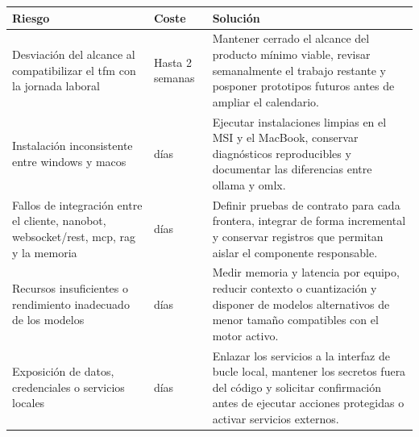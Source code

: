 \begin{table}[p]
    \centering
    \footnotesize
    \renewcommand{\arraystretch}{1.15}
    \begin{tabularx}{\textwidth}{
            |>{\raggedright\arraybackslash}p{4.2cm}
            |>{\centering\arraybackslash}p{2.1cm}
            |>{\raggedright\arraybackslash}X|
        }
        \hline
        \textbf{Riesgo} & \textbf{Coste}                                                                                                                                                                          & \textbf{Solución} \\ \hline
        Desviación del alcance al compatibilizar el \gls{tfm} con la jornada laboral
                        & Hasta 2 semanas
                        & Mantener cerrado el alcance del producto mínimo viable, revisar semanalmente el trabajo restante y posponer prototipos futuros antes de ampliar el calendario.                                              \\ \hline
        Instalación inconsistente entre \gls{windows} y \gls{macos}
                        & 5 días
                        & Ejecutar instalaciones limpias en el MSI y el MacBook, conservar diagnósticos reproducibles y documentar las diferencias entre \gls{ollama} y \gls{omlx}.                                                   \\ \hline
        Fallos de integración entre el cliente, \gls{nanobot}, \gls{websocket}/\gls{rest}, \gls{mcp}, \gls{rag} y la memoria
                        & 5 días
                        & Definir pruebas de contrato para cada frontera, integrar de forma incremental y conservar registros que permitan aislar el componente responsable.                                                          \\ \hline
        Recursos insuficientes o rendimiento inadecuado de los modelos
                        & 5 días
                        & Medir memoria y latencia por equipo, reducir contexto o cuantización y disponer de modelos alternativos de menor tamaño compatibles con el motor activo.                                                    \\ \hline
        Exposición de datos, credenciales o servicios locales
                        & 4 días
                        & Enlazar los servicios a la interfaz de bucle local, mantener los secretos fuera del código y solicitar confirmación antes de ejecutar acciones protegidas o activar servicios externos.                     \\ \hline

\end{tabularx}
\end{table}
